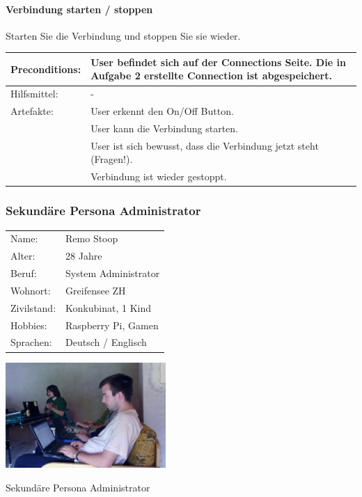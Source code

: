 \paragraph{Verbindung starten / stoppen}
Starten Sie die Verbindung und stoppen Sie sie wieder. \\


\begin{tabular}{ | p{} | p{} | }
\hline
Preconditions: & User befindet sich auf der Connections Seite. Die in Aufgabe 2 erstellte Connection ist abgespeichert. \\
\hline
Hilfsmittel: & - \\
\hline
Artefakte: & User erkennt den On/Off Button. \\
& User kann die Verbindung starten. \\
& User ist sich bewusst, dass die Verbindung jetzt steht (Fragen!). \\
& Verbindung ist wieder gestoppt. \\
\hline
\end{tabular}

\newpage
\subsubsection{Sekundäre Persona Administrator}

\noindent\begin{minipage}[t]{0.5\textwidth}
\vspace{0pt}
    \begin{tabular}{ l l }
        Name: & Remo Stoop \\
        Alter: & 28 Jahre \\
        Beruf: & System Administrator \\
        Wohnort: & Greifensee ZH \\
        Zivilstand: & Konkubinat, 1 Kind \\
        Hobbies: & Raspberry Pi, Gamen \\
        Sprachen: & Deutsch / Englisch \\
    \end{tabular}
\end{minipage}
\hfill
\begin{minipage}[t]{0.5\textwidth}
\vspace{0pt}
    \includegraphics[width=230px]{images/administrator.jpg}
    \caption[Sekundäre Persona Administrator]{Sekundäre Persona Administrator}
\end{minipage}


